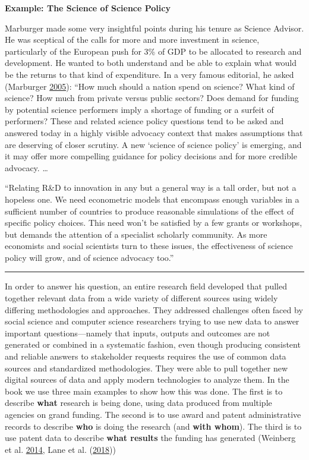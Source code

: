 \documentclass[]{krantz}
\begin{document}
\textbf{Example: The Science of Science Policy}

Marburger made some very insightful points during his tenure as Science
Advisor. He was sceptical of the calls for more and more investment in
science, particularly of the European push for 3\% of GDP to be
allocated to research and development. He wanted to both understand and
be able to explain what would be the returns to that kind of
expenditure. In a very famous editorial, he asked (Marburger
\protect\hyperlink{ref-marburger2005wanted}{2005}): ``How much should a
nation spend on science? What kind of science? How much from private
versus public sectors? Does demand for funding by potential science
performers imply a shortage of funding or a surfeit of performers? These
and related science policy questions tend to be asked and answered today
in a highly visible advocacy context that makes assumptions that are
deserving of closer scrutiny. A new `science of science policy' is
emerging, and it may offer more compelling guidance for policy decisions
and for more credible advocacy. \ldots{}

``Relating R\&D to innovation in any but a general way is a tall order,
but not a hopeless one. We need econometric models that encompass enough
variables in a sufficient number of countries to produce reasonable
simulations of the effect of specific policy choices. This need won't be
satisfied by a few grants or workshops, but demands the attention of a
specialist scholarly community. As more economists and social scientists
turn to these issues, the effectiveness of science policy will grow, and
of science advocacy too.''

\begin{center}\rule{0.5\linewidth}{\linethickness}\end{center}

In order to answer his question, an entire research field developed that
pulled together relevant data from a wide variety of different sources
using widely differing methodologies and approaches. They addressed
challenges often faced by social science and computer science
researchers trying to use new data to answer important
questions---namely that inputs, outputs and outcomes are not generated
or combined in a systematic fashion, even though producing consistent
and reliable answers to stakeholder requests requires the use of common
data sources and standardized methodologies. They were able to pull
together new digital sources of data and apply modern technologies to
analyze them. In the book we use three main examples to show how this
was done. The first is to describe \textbf{what} research is being done,
using data produced from multiple agencies on grand funding. The second
is to use award and patent administrative records to describe
\textbf{who} is doing the research (and \textbf{with whom}). The third
is to use patent data to describe \textbf{what results} the funding has
generated (Weinberg et al.
\protect\hyperlink{ref-weinberg2014science}{2014}, Lane et al.
(\protect\hyperlink{ref-Lane2018}{2018}))
\end{document}
